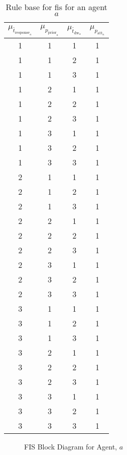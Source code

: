\documentclass[conference]{IEEEtran}
\begin{document}
\begin{table}[]
    \centering
    \caption{Rule base for \gls{fis} for an agent $a$}
    \label{tab:fis_rulebase}
    \begin{tabular}{cccc}
    \toprule
        $\mu_{\bar{t}_{\text{response}_{a}}}$ & $\mu_{p_{\text{prior}_{a}}}$ & $\mu_{\bar{t}_{\text{dw}_{a}}}$ & $\mu_{p_{\text{att}_{a}}}$ \\    
    \midrule
        1 & 1 & 1 & 1 \\
        1 & 1 & 2 & 1 \\
        1 & 1 & 3 & 1 \\
        1 & 2 & 1 & 1 \\
        1 & 2 & 2 & 1 \\
        1 & 2 & 3 & 1 \\
        1 & 3 & 1 & 1 \\
        1 & 3 & 2 & 1 \\
        1 & 3 & 3 & 1 \\
        2 & 1 & 1 & 1 \\
        2 & 1 & 2 & 1 \\
        2 & 1 & 3 & 1 \\
        2 & 2 & 1 & 1 \\
        2 & 2 & 2 & 1 \\
        2 & 2 & 3 & 1 \\
        2 & 3 & 1 & 1 \\
        2 & 3 & 2 & 1 \\
        2 & 3 & 3 & 1 \\
        3 & 1 & 1 & 1 \\
        3 & 1 & 2 & 1 \\
        3 & 1 & 3 & 1 \\
        3 & 2 & 1 & 1 \\
        3 & 2 & 2 & 1 \\
        3 & 2 & 3 & 1 \\
        3 & 3 & 1 & 1 \\
        3 & 3 & 2 & 1 \\
        3 & 3 & 3 & 1 \\
        \bottomrule
    \end{tabular}
\end{table}

\begin{figure}
    \centering
    
    \caption{FIS Block Diagram for Agent, $a$}
    \label{fig:ss_fis}
\end{figure}
\end{document}
